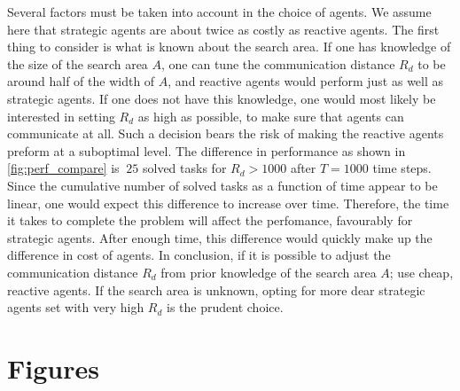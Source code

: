 \documentclass[11pt]{article}
\begin{document}
        Several factors must be taken into account in the choice of agents. We assume here that strategic agents 
        are about twice as costly as reactive agents. The first thing to consider is what is known about the 
        search area. If one has knowledge of the size of the search area $A$, one can tune the communication 
        distance $R_d$ to be around half of the width of $A$, and reactive agents would perform just as well as 
        strategic agents. If one does not have this knowledge, one would 
        most likely be interested in setting $R_d$ as high as possible, to make sure that agents can communicate at 
        all. Such a decision bears the risk of making the reactive agents preform at a suboptimal level.
        The difference in performance
        as shown in \autoref{fig:perf_compare} is $~25$ solved tasks for $R_d>1000$ after $T=1000$ time 
        steps. Since the cumulative number of solved tasks as a function of time appear to be linear,
        one would expect this difference to increase over time. Therefore, the time it takes to complete 
        the problem will affect the perfomance, favourably for strategic agents. After enough time, this 
        difference would quickly make up the difference in cost of agents. In conclusion, if it is possible
        to adjust the communication distance $R_d$ from prior knowledge of the search area $A$; use cheap,
        reactive agents. If the search area is unknown, opting for more dear strategic agents set with 
        very high $R_d$ is the prudent choice.

\printbibliography

\pagebreak
\appendix

\section{Figures}
\label{app:figs}
\end{document}
